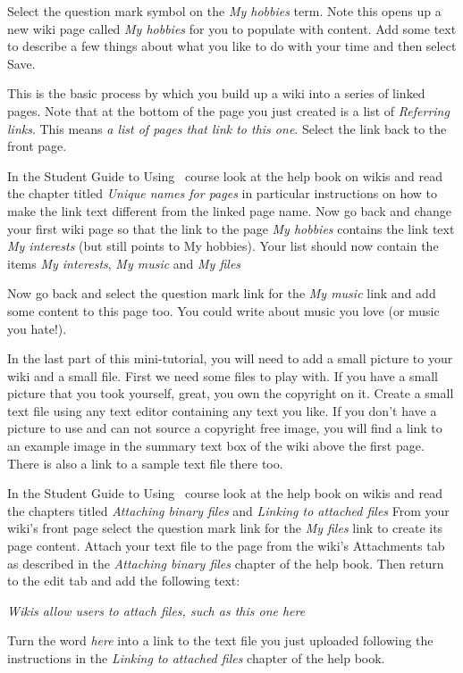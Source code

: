 Select the question mark symbol on the \emph{My hobbies} term. Note this opens up a new wiki page called \emph{My hobbies} for you to populate with content. Add some text to describe a few things about what you like to do with your time and then select Save.

This is the basic process by which you build up a wiki into a series of linked pages. Note that at the bottom of the page you just created is a list of \emph{Referring links}.  This means \emph{a list of pages that link to this one}.  Select the link back to the front page.

In the Student Guide to Using \moodle\ course look at the help book on wikis and read the chapter titled \emph{Unique names for pages}  in particular instructions on how to make the link text different from the linked page name. Now go back and change your first wiki page so that the link to the page \emph{My hobbies} contains the link text \emph{My interests} (but still points to My hobbies). Your list should now contain the items \emph{My interests},  \emph{My music}  and \emph{My files} 

Now go back and select the question mark link for the \emph{My music} link and add some content to this page too. You could write about music you love (or music you hate!).

In the last part of this mini-tutorial, you will need to add a small picture to your wiki and a small file. First we need some files to play with. If you have a small picture that you took yourself, great, you own the copyright on it. Create a small text file using any text editor containing any text you like. If you don't have a picture to use and can not source a copyright free image, you will find a link to an example image in the summary text box of the wiki above the first page. There is also a link to a sample text file there too.

In the Student Guide to Using \moodle\ course look at the help book on wikis and read the chapters titled \emph{Attaching binary files} and \emph{Linking to attached files}  From your wiki's front page select the question mark link for the \emph{My files} link to create its page content. Attach your text file to the page from the wiki's Attachments tab as described in the \emph{Attaching binary files} chapter of the help book. Then return to the edit tab and add the following text:

\emph{Wikis allow users to attach files, such as this one here}  

Turn the word \emph{here} into a link to the text file you just uploaded following the instructions in the \emph{Linking to attached files} chapter of the help book.

